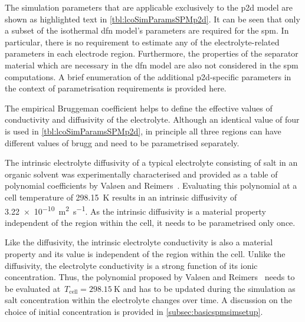 The simulation parameters that are applicable exclusively to the \gls{p2d} model
are shown as  highlighted text in \cref{tbl:lcoSimParamsSPMp2d}. It  can be seen
that only a  subset of the isothermal \gls{dfn} model's  parameters are required
for the \gls{spm}. In particular, there is no requirement to estimate any of the
electrolyte-related  parameters  in  each  electrode  region.  Furthermore,  the
properties of the separator material which  are necessary in the \gls{dfn} model
are also  not considered in the  \gls{spm} computations. A brief  enumeration of
the additional  \gls{p2d}-specific parameters in the  context of parametrisation
requirements is provided here.

\begin{enumdescriptnum}[leftmargin=!,itemsep=1ex,labelwidth=\widthof{$\symbf{\text{brugg}_j}\ \scriptstyle (\times 3)$abc}
    ,partopsep=0pt
    ,topsep=0pt
    ]

      The  empirical Bruggeman  coefficient  helps
    to  define  the   effective  values  of  conductivity   and  diffusivity  of
    the   electrolyte.   Although  an   identical   value   of  four   is   used
    in \cref{tbl:lcoSimParamsSPMp2d}, in  principle all  three regions  can have
    different values of brugg and need to be parametrised separately.

      The  intrinsic  electrolyte   diffusivity  of  a  typical
    electrolyte  consisting  of    salt in  an  organic  solvent  was
    experimentally  characterised   and  provided  as  a   table  of  polynomial
    coefficients  by  Valøen  and  Reimers~\cite{Valoen2005}.  Evaluating  this
    polynomial  at a  cell  temperature of  \SI{298.15}{\kelvin}  results in  an
    intrinsic  diffusivity of  \SI{3.22e-10}{\meter\squared\per\second}. As  the
    intrinsic  diffusivity is  a material  property  independent of  the
    region within the cell, it needs to be parametrised only once.

       Like    the   diffusivity,   the
    intrinsic electrolyte conductivity is also a material property and its value
    is independent  of the region within  the cell. Unlike the  diffusivity, the
    electrolyte conductivity  is a strong  function of its  ionic concentration.
    Thus, the polynomial proposed by Valøen and Reimers~\cite{Valoen2005} needs
    to  be evaluated  at~$T_\text{cell}= \SI{298.15}{\kelvin}$  and  has to  be
    updated during the  simulation as salt concentration  within the electrolyte
    changes over time. A discussion on the choice of initial concentration is
    provided in \cref{subsec:basicspmsimsetup}.


\end{enumdescriptnum}
